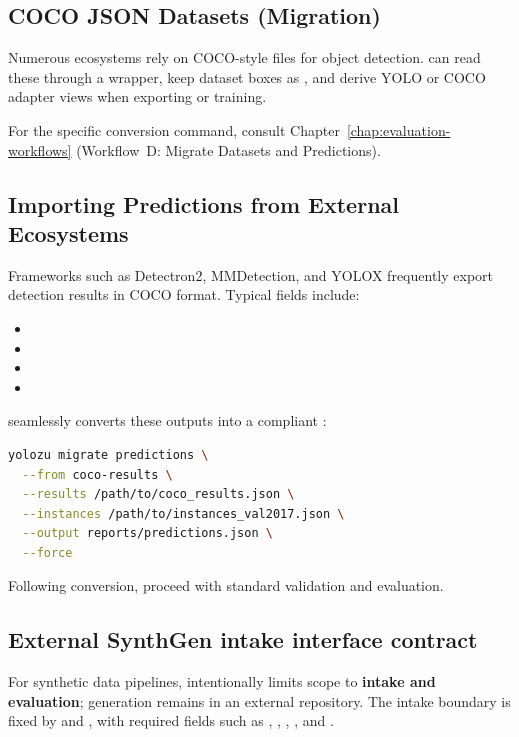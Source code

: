 \subsection{COCO JSON Datasets (Migration)}
Numerous ecosystems rely on COCO-style  files for object detection. \yolozu{} can read these through a  wrapper, keep dataset boxes as , and derive YOLO or COCO adapter views when exporting or training.

For the specific conversion command, consult Chapter~\ref{chap:evaluation-workflows} (Workflow~D: Migrate Datasets and Predictions).

\subsection{Importing Predictions from External Ecosystems}
Frameworks such as Detectron2, MMDetection, and YOLOX frequently export detection results in COCO format. Typical fields include:
\begin{itemize}
  \item {}
  \item {}
  \item {}
  \item {}
\end{itemize}

\yolozu{} seamlessly converts these outputs into a compliant :
\begin{lstlisting}[language=bash]
yolozu migrate predictions \
  --from coco-results \
  --results /path/to/coco_results.json \
  --instances /path/to/instances_val2017.json \
  --output reports/predictions.json \
  --force
\end{lstlisting}

Following conversion, proceed with standard validation and evaluation.

\subsection{External SynthGen intake interface contract}
For synthetic data pipelines, \yolozu{} intentionally limits scope to \textbf{intake and evaluation}; generation remains in an external repository.
The intake boundary is fixed by  and , with required fields such as , , , , and .

